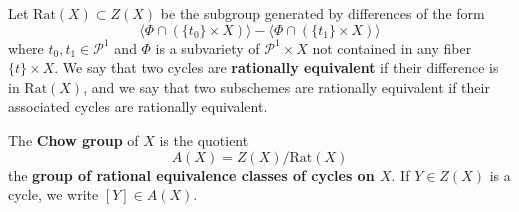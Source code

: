 \begin{definition}
    Let $\text{Rat}(X) \subset Z(X)$ be the subgroup generated by differences of the form $$\langle \Phi\cap(\{t_0\}\times X)\rangle - \langle \Phi\cap (\{t_1\}\times X)\rangle$$
    where $t_0,t_1 \in \mathcal{P}^1$ and $\Phi$ is a subvariety of $\mathcal{P}^1\times X$ not contained in any fiber $\{t\}\times X$. We say that two cycles are \textbf{rationally equivalent} if their difference is in $\text{Rat}(X)$, and we say that two subschemes are rationally equivalent if their associated cycles are rationally equivalent.
\end{definition}

\begin{definition}
    The \textbf{Chow group} of $X$ is the quotient $$A(X) = Z(X)/\text{Rat}(X)$$
    the \textbf{group of rational equivalence classes of cycles on $X$}. If $Y \in Z(X)$ is a cycle, we write $[Y] \in A(X)$.
\end{definition}

